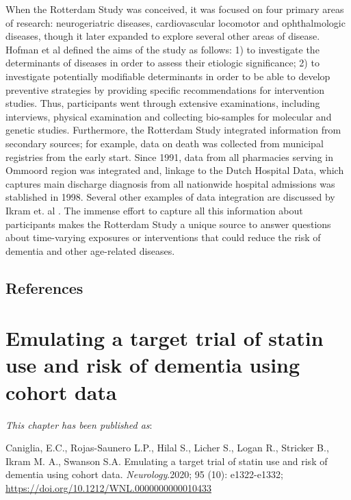 \documentclass[
]{book}
\begin{document}
When the Rotterdam Study was conceived, it was focused on four primary areas of research: neurogeriatric diseases, cardiovascular locomotor and ophthalmologic diseases, though it later expanded to explore several other areas of disease. Hofman et al defined the aims of the study as follows: 1) to investigate the determinants of diseases in order to assess their etiologic significance; 2) to investigate potentially modifiable determinants in order to be able to develop preventive strategies by providing specific recommendations for intervention studies\autocite{hofman1991}. Thus, participants went through extensive examinations, including interviews, physical examination and collecting bio-samples for molecular and genetic studies. Furthermore, the Rotterdam Study integrated information from secondary sources; for example, data on death was collected from municipal registries from the early start. Since 1991, data from all pharmacies serving in Ommoord region was integrated and, linkage to the Dutch Hospital Data, which captures main discharge diagnosis from all nationwide hospital admissions was stablished in 1998. Several other examples of data integration are discussed by Ikram et. al \autocite{ikram2020}. The immense effort to capture all this information about participants makes the Rotterdam Study a unique source to answer questions about time-varying exposures or interventions that could reduce the risk of dementia and other age-related diseases.

\newpage

\hypertarget{references}{%
\section{References}\label{references}}

\hypertarget{chapter2}{%
\chapter{Emulating a target trial of statin use and risk of dementia using cohort data}\label{chapter2}}

\small

\noindent
\emph{This chapter has been published as}:

Caniglia, E.C., Rojas-Saunero L.P., Hilal S., Licher S., Logan R., Stricker B., Ikram M. A., Swanson S.A. Emulating a target trial of statin use and risk of dementia using cohort data. \emph{Neurology}.2020; 95 (10): e1322-e1332;
\url{https://doi.org/10.1212/WNL.0000000000010433}
\end{document}

